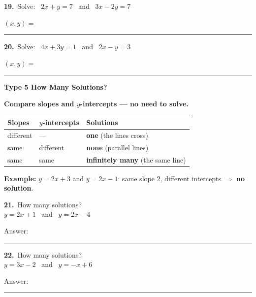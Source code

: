\documentclass[11pt,letterpaper]{article}
\newcommand{\topicbar}[1]{\needspace{4.5cm}\par\vspace{5mm}
  \begin{tcolorbox}[enhanced,colback=fmtitle,colframe=fmtitle,arc=2mm,left=4mm,top=1.5mm,bottom=1.5mm]
  \color{white}\bfseries\large #1
  \end{tcolorbox}}
\begin{document}
\needspace{3.9cm}\par\vspace{3mm}\noindent \begin{minipage}[t][3.4cm]{0.48\linewidth}\raggedright{\color{fmturn}\bfseries 19.}\ Solve: \ $2x + y = 7$ \ and \ $3x - 2y = 7$\par\vfill\hfill $(x, y) =$\ \rule{3.2cm}{0.4pt}\end{minipage}\hfill \begin{minipage}[t][3.4cm]{0.48\linewidth}\raggedright{\color{fmturn}\bfseries 20.}\ Solve: \ $4x + 3y = 1$ \ and \ $2x - y = 3$\par\vfill\hfill $(x, y) =$\ \rule{3.2cm}{0.4pt}\end{minipage}\par
\needspace{9cm}\topicbar{Type 5 \quad How Many Solutions?}
\begin{watchme}\textbf{Compare slopes and $y$-intercepts --- no need to solve.}\par\vspace{1mm}\renewcommand{\arraystretch}{1.6}\begin{tabular}{@{}l l l@{}}\textbf{Slopes} & \textbf{$y$-intercepts} & \textbf{Solutions}\\ \hline different & --- & \textbf{one} (the lines cross)\\ same & different & \textbf{none} (parallel lines)\\ same & same & \textbf{infinitely many} (the same line)\end{tabular}\par\vspace{2mm}\textbf{Example:} $y = 2x + 3$ and $y = 2x - 1$: same slope 2, different intercepts $\Rightarrow$ \textbf{no solution}.\end{watchme}
\needspace{3.1cm}\par\vspace{3mm}\noindent \begin{minipage}[t][2.6cm]{0.48\linewidth}\raggedright{\color{fmturn}\bfseries 21.}\ How many solutions? \\ $y = 2x + 1$ \ and \ $y = 2x - 4$\par\vfill\hfill Answer:\ \rule{3.2cm}{0.4pt}\end{minipage}\hfill \begin{minipage}[t][2.6cm]{0.48\linewidth}\raggedright{\color{fmturn}\bfseries 22.}\ How many solutions? \\ $y = 3x - 2$ \ and \ $y = -x + 6$\par\vfill\hfill Answer:\ \rule{3.2cm}{0.4pt}\end{minipage}\par
\end{document}
